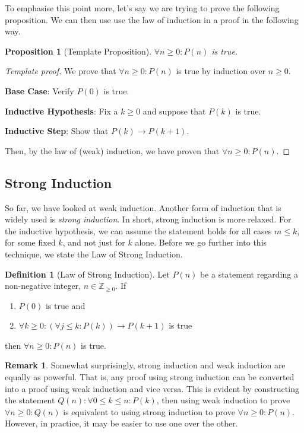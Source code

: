 \documentclass{article}
\newcommand{\ra}{\rightarrow}
\newcommand{\ZZ}{\mathbb{Z}_{\geq 0}}
\theoremstyle{plain}
\newtheorem*{proposition*}{Proposition}
\theoremstyle{definition}
\newtheorem{definition}{Definition}
\newtheorem{remark}{Remark}
\begin{document}
To emphasise this point more, let's say we are trying to prove the following proposition. We can then use use the law of induction in a proof in the following way.

\begin{proposition*}[Template Proposition]
    \(\forall n \geq 0 : P(n)\) is true.
\end{proposition*}
\begin{proof}[Template proof]
    We prove that \(\forall n \geq 0 : P(n)\) is true by induction over \(n \geq 0\).
    
    \textbf{Base Case}: Verify \(P(0)\) is true.

    \textbf{Inductive Hypothesis}: Fix a \(k \geq 0\) and suppose that \(P(k)\) is true.

    \textbf{Inductive Step}: Show that \(P(k) \ra P(k+1)\).

    Then, by the law of (weak) induction, we have proven that \(\forall n \geq 0 : P(n)\).
\end{proof}
 
\subsection{Strong Induction}

So far, we have looked at weak induction. Another form of induction that is widely used is \emph{strong induction}. In short, strong induction is more relaxed. For the inductive hypothesis, we can assume the statement holds for all cases \(m \leq k\), for some fixed \(k\), and not just for \(k\) alone. Before we go further into this technique, we state the Law of Strong Induction.

\begin{definition}[Law of Strong Induction]
    Let \(P(n)\) be a statement regarding a non-negative integer, \(n \in \ZZ\). If
    \begin{enumerate}
        \item \(P(0)\) is true and
        \item \(\forall k \geq 0 : (\forall j \leq k :  P(k)) \ra P(k+1)\) is true
    \end{enumerate}    
    then \(\forall n \geq 0 : P(n)\) is true.
\end{definition}

\begin{remark}
Somewhat surprisingly, strong induction and weak induction are equally as powerful. That is, any proof using strong induction can be converted into a proof using weak induction and vice versa. This is evident by constructing the statement \(Q(n): \forall 0 \leq k \leq n : P(k)\), then using weak induction to prove \(\forall n \geq 0 : Q(n)\) is equivalent to using strong induction to prove \(\forall n \geq 0 : P(n)\). However, in practice, it may be easier to use one over the other.
\end{remark}
\end{document}
